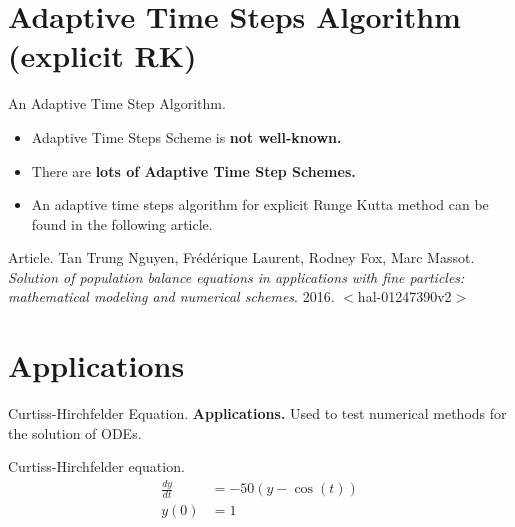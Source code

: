 \documentclass[9pt]{beamer}
\numberwithin{equation}{section}
\begin{document}
\section{Adaptive Time Steps Algorithm (explicit RK)}
\begin{frame}{An Adaptive Time Step Algorithm.}
\begin{itemize}
\item Adaptive Time Steps Scheme is \textbf{not well-known.}
\item There are \textbf{lots of Adaptive Time Step Schemes.}
\item An adaptive time steps algorithm for explicit Runge Kutta method can be found in the following article.
\end{itemize}
\begin{alertblock}{Article.}
Tan Trung Nguyen, Frédérique Laurent, Rodney Fox, Marc Massot. \textit{Solution of population balance equations in applications with fine particles: mathematical modeling and numerical schemes}. 2016. $<$hal-01247390v2$>$
\end{alertblock}


\end{frame}



\section{Applications}
\begin{frame}{Curtiss-Hirchfelder Equation.}
\textbf{\textsf{Applications.}} Used to test numerical methods for the solution of ODEs.
\begin{block}{Curtiss-Hirchfelder equation.}
\begin{align}
\frac{{dy}}{{dt}} &=  - 50\left( {y - \cos \left( t \right)} \right)\\
y\left( 0 \right) &= 1
\end{align}
\end{block}
\end{frame}
\end{document}
